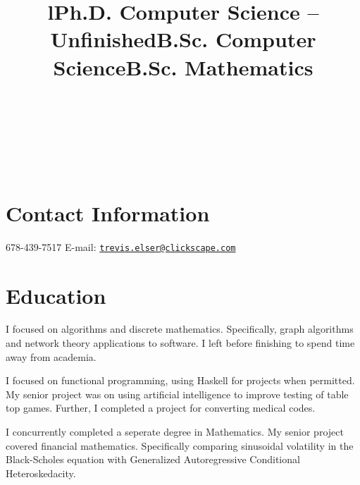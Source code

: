 \documentclass[margintitle,line]{res}
\begin{document}

\begin{resume}

\begin{format}
\\
\title{l}\\
\body\\
\end{format}

\section{Contact Information}

678-439-7517 \hfill {E-mail:} \href{mailto:trevis.elser@clickscape.com}{\nolinkurl{trevis.elser@clickscape.com}} \\

\section{Education}

\title{Ph.D. Computer Science -- Unfinished}
\begin{position}
I focused on algorithms and discrete mathematics. Specifically, graph algorithms and network theory applications to software. I left before finishing to spend time away from academia.
\end{position}

\title{B.Sc. Computer Science}
\begin{position}
I focused on functional programming, using Haskell for projects when permitted. My senior project was on using artificial intelligence to improve testing of table top games. Further, I completed a project for converting medical codes.
\end{position}

\title{B.Sc. Mathematics}
\begin{position}
I concurrently completed a seperate degree in Mathematics. My senior project covered financial mathematics. Specifically comparing sinusoidal volatility in the Black-Scholes equation with Generalized Autoregressive Conditional Heteroskedacity.
\end{position}


\end{resume}
\end{document}
